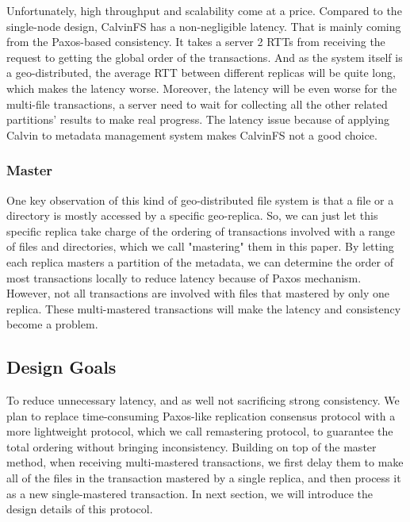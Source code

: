 Unfortunately, high throughput and scalability come at a price. Compared to the single-node design, CalvinFS has a non-negligible latency. That is mainly coming from the Paxos-based consistency. It takes a server 2 RTTs from receiving the request to getting the global order of the transactions. And as the system itself is a geo-distributed, the average RTT between different replicas will be quite long, which makes the latency worse. Moreover, the latency will be even worse for the multi-file transactions, a server need to wait for collecting all the other related partitions' results to make real progress. The latency issue because of applying Calvin to metadata management system makes CalvinFS not a good choice.

\subsubsection{Master}
One key observation of this kind of geo-distributed file system is that a file or a directory is mostly accessed by a specific geo-replica. So, we can just let this specific replica take charge of the ordering of transactions involved with a range of files and directories, which we call "mastering" them in this paper. By letting each replica masters a partition of the metadata, we can determine the order of most transactions locally to reduce latency because of Paxos mechanism.  However, not all transactions are involved with files that mastered by only one replica. These multi-mastered transactions will make the latency and consistency become a problem. 

\subsection{Design Goals}
To reduce unnecessary latency, and as well not sacrificing strong consistency. We plan to replace time-consuming Paxos-like replication consensus protocol with a more lightweight protocol, which we call remastering protocol, to guarantee the total ordering without bringing inconsistency. Building on top of the master method, when receiving multi-mastered transactions, we first delay them to make all of the files in the transaction mastered by a single replica, and then process it as a new single-mastered transaction. In next section, we will introduce the design details of this protocol.

